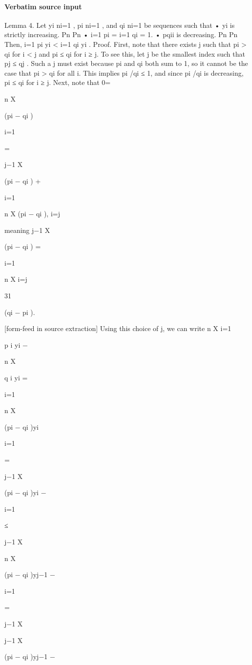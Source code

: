 \documentclass[10pt]{article}
\begin{document}
\paragraph{Verbatim source input}
\begin{ReviewVerbatim}
Lemma 4. Let {yi }ni=1 , {pi }ni=1 , and {qi }ni=1 be sequences such that
• yi is strictly increasing.
Pn
Pn
•
i=1 pi =
i=1 qi = 1.
• pqii is decreasing.
Pn
Pn
Then, i=1 pi yi < i=1 qi yi .
Proof. First, note that there exists j such that pi > qi for i < j and pi ≤ qi for i ≥ j. To see this, let j be
the smallest index such that pj ≤ qj . Such a j must exist because pi and qi both sum to 1, so it cannot be
the case that pi > qi for all i. This implies pi /qi ≤ 1, and since pi /qi is decreasing, pi ≤ qi for i ≥ j.
Next, note that
0=

n
X

(pi − qi )

i=1

=

j−1
X

(pi − qi ) +

i=1

n
X
(pi − qi ),
i=j

meaning
j−1
X

(pi − qi ) =

i=1

n
X
i=j

31

(qi − pi ).


[form-feed in source extraction]
Using this choice of j, we can write
n
X
i=1

p i yi −

n
X

q i yi =

i=1

n
X

(pi − qi )yi

i=1

=

j−1
X

(pi − qi )yi −

i=1

≤

j−1
X

n
X

(pi − qi )yj−1 −

i=1

=

j−1
X

j−1
X

(pi − qi )yj−1 −


\end{ReviewVerbatim}
\end{document}
